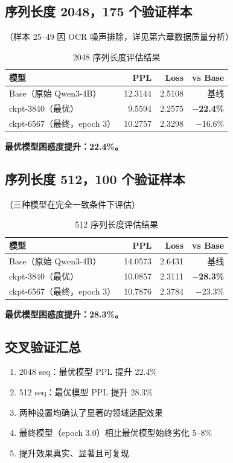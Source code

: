 \documentclass[12pt,a4paper]{ctexart}
\begin{document}
\subsection{序列长度 2048，175 个验证样本}

（样本 25--49 因 OCR 噪声排除，详见第六章数据质量分析）

\begin{table}[htbp]\centering
\caption{2048 序列长度评估结果}
\begin{tabular}{@{}lrrr@{}}
\toprule
\textbf{模型} & \textbf{PPL} & \textbf{Loss} & \textbf{vs Base} \\
\midrule
Base（原始 Qwen3-4B）   & 12.3144 & 2.5108 & 基线 \\
ckpt-3840（最优）       & 9.5594  & 2.2575 & \textbf{$-$22.4\%} \\
ckpt-6567（最终，epoch 3）& 10.2757 & 2.3298 & $-$16.6\% \\
\bottomrule
\end{tabular}
\end{table}

\textbf{最优模型困惑度提升：22.4\%。}

\subsection{序列长度 512，100 个验证样本}

（三种模型在完全一致条件下评估）

\begin{table}[htbp]\centering
\caption{512 序列长度评估结果}
\begin{tabular}{@{}lrrr@{}}
\toprule
\textbf{模型} & \textbf{PPL} & \textbf{Loss} & \textbf{vs Base} \\
\midrule
Base（原始 Qwen3-4B）   & 14.0573 & 2.6431 & 基线 \\
ckpt-3840（最优）       & 10.0857 & 2.3111 & \textbf{$-$28.3\%} \\
ckpt-6567（最终，epoch 3）& 10.7876 & 2.3784 & $-$23.3\% \\
\bottomrule
\end{tabular}
\end{table}

\textbf{最优模型困惑度提升：28.3\%。}

\subsection{交叉验证汇总}

\begin{enumerate}[nosep]
    \item 2048 seq：最优模型 PPL 提升 22.4\%
    \item 512 seq：最优模型 PPL 提升 28.3\%
    \item 两种设置均确认了显著的领域适配效果
    \item 最终模型（epoch 3.0）相比最优模型始终劣化 5--8\%
    \item 提升效果真实、显著且可复现
\end{enumerate}
\end{document}
